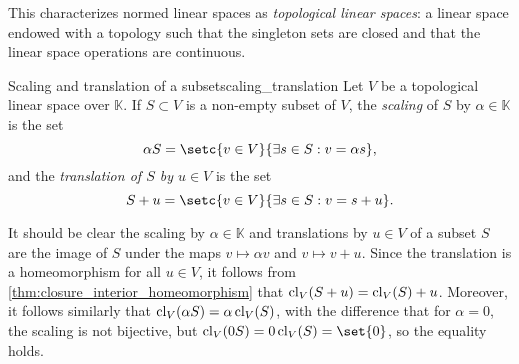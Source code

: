 This characterizes normed linear spaces as \emph{topological linear spaces}: a linear space endowed with a topology such that the singleton sets are closed and that the linear space operations are continuous.
\begin{definition}{Scaling and translation of a subset}{scaling_translation}
    Let \(V\) be a topological linear space over \(\mathbb{K}\). If \(S \subset V\) is a non-empty subset of \(V\), the \emph{scaling} of \(S\) by \(\alpha \in \mathbb{K}\) is the set
    \begin{equation*}
        \alpha S = \setc{v \in V}{\exists s \in S : v = \alpha s},
    \end{equation*}
    and the \emph{translation of \(S\) by \(u \in V\)} is the set
    \begin{equation*}
        S + u = \setc{v \in V}{\exists s \in S : v = s + u}.
    \end{equation*}
\end{definition}
It should be clear the scaling by \(\alpha \in \mathbb{K}\) and translations by \(u \in V\) of a subset \(S\) are the image of \(S\) under the maps \(v \mapsto \alpha v\) and \(v \mapsto v + u\). Since the translation is a homeomorphism for all \(u \in V\), it follows from \cref{thm:closure_interior_homeomorphism} that \(\operatorname{cl}_V(S + u) = \operatorname{cl}_V(S) + u\). Moreover, it follows similarly that \(\operatorname{cl}_V(\alpha S) = \alpha\operatorname{cl}_V(S)\), with the difference that for \(\alpha = 0\), the scaling is not bijective, but \(\cl_V(0S) = 0\cl_V(S) = \set{0}\), so the equality holds.
%
